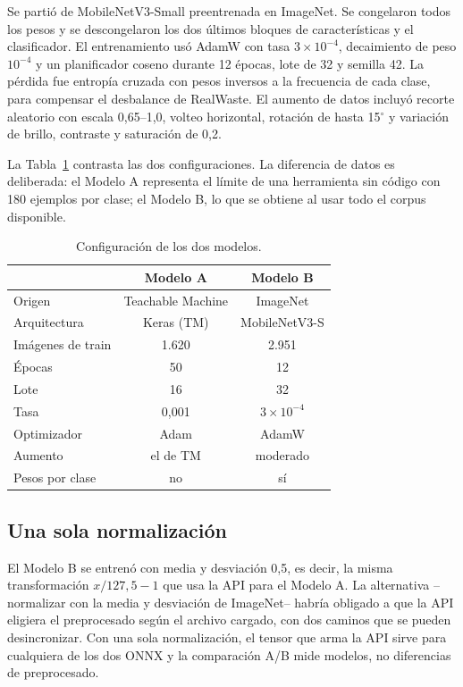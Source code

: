\documentclass[10pt]{ieeeconf}
\begin{document}
Se parti\'o de MobileNetV3-Small preentrenada en ImageNet. Se congelaron todos los
pesos y se descongelaron los dos \'ultimos bloques de caracter\'isticas y el
clasificador. El entrenamiento us\'o AdamW con tasa $3\times10^{-4}$, decaimiento
de peso $10^{-4}$ y un planificador coseno durante 12 \'epocas, lote de 32 y
semilla 42. La p\'erdida fue entrop\'ia cruzada con pesos inversos a la frecuencia
de cada clase, para compensar el desbalance de RealWaste. El aumento de datos
incluy\'o recorte aleatorio con escala 0,65--1,0, volteo horizontal, rotaci\'on de
hasta 15$^\circ$ y variaci\'on de brillo, contraste y saturaci\'on de 0,2.

La Tabla~\ref{tab:hiper} contrasta las dos configuraciones. La diferencia de
datos es deliberada: el Modelo A representa el l\'imite de una herramienta sin
c\'odigo con 180 ejemplos por clase; el Modelo B, lo que se obtiene al usar todo
el corpus disponible.

\begin{table}[t]
\centering
\caption{Configuraci\'on de los dos modelos.}
\label{tab:hiper}
\footnotesize
\setlength{\tabcolsep}{3pt}
\begin{tabular}{@{}lcc@{}}
\toprule
 & Modelo A & Modelo B \\
\midrule
Origen & Teachable Machine & ImageNet \\
Arquitectura & Keras (TM) & MobileNetV3-S \\
Im\'agenes de train & 1.620 & 2.951 \\
\'Epocas & 50 & 12 \\
Lote & 16 & 32 \\
Tasa & 0,001 & $3\times10^{-4}$ \\
Optimizador & Adam & AdamW \\
Aumento & el de TM & moderado \\
Pesos por clase & no & s\'i \\
\bottomrule
\end{tabular}
\end{table}

\subsection{Una sola normalizaci\'on}

El Modelo B se entren\'o con media y desviaci\'on 0,5, es decir, la misma
transformaci\'on $x/127{,}5-1$ que usa la API para el Modelo A. La alternativa
--normalizar con la media y desviaci\'on de ImageNet-- habr\'ia obligado a que la
API eligiera el preprocesado seg\'un el archivo cargado, con dos caminos que se
pueden desincronizar. Con una sola normalizaci\'on, el tensor que arma la API
sirve para cualquiera de los dos ONNX y la comparaci\'on A/B mide modelos, no
diferencias de preprocesado.
\end{document}
